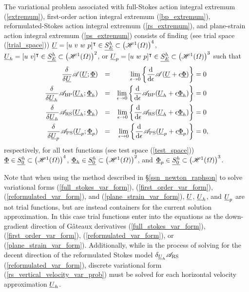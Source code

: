 The variational problem associated with full-Stokes action integral extremum (\ref{extremum}), first-order action integral extremum (\ref{bp_extremum}), reformulated-Stokes action integral extremum (\ref{rs_extremum}), and plane-strain action integral extremum (\ref{ps_extremum}) consists of finding (see trial space (\ref{trial_space})) $\underline{U} = [u\ v\ w\ p]^\intercal \in \underline{S_E^h} \subset \left( \mathscr{H}^1(\varOmega) \right)^4$, $\underline{U}_h = [u\ v]^\intercal \in \underline{S_E^h} \subset \left( \mathscr{H}^1(\varOmega) \right)^2$, or $\underline{U}_p = [u\ w\ p]^\intercal \in \underline{S_E^h} \subset \left( \mathscr{H}^1(\varOmega) \right)^3$ such that
{\small
\begin{align}
  \label{full_stokes_var_form}
  \frac{\delta{^{}} }{\delta \underline{U}{^{}} } \mathscr{A}(\underline{U}; \underline{\Phi}) &&= && \lim_{\epsilon \rightarrow 0} \left\{ \frac{\mathrm{d}^{} }{\mathrm{d} \epsilon^{} } \mathscr{A}(\underline{U} + \epsilon \underline{\Phi}) \right\} &= 0 \\
  \label{first_order_var_form}
  \frac{\delta{^{}} }{\delta \underline{U}_h{^{}} } \mathscr{A}_{\text{BP}}(\underline{U}_h; \underline{\Phi}_h) &&= && \lim_{\epsilon \rightarrow 0} \left\{ \frac{\mathrm{d}^{} }{\mathrm{d} \epsilon^{} } \mathscr{A}_{\text{BP}}(\underline{U}_h + \epsilon \underline{\Phi}_h) \right\} &= 0 \\
  \label{reformulated_var_form}
  \frac{\delta{^{}} }{\delta \underline{U}_h{^{}} } \mathscr{A}_{\text{RS}} (\underline{U}_h; \underline{\Phi}_h) &&= && \lim_{\epsilon \rightarrow 0} \left\{ \frac{\mathrm{d}^{} }{\mathrm{d} \epsilon^{} } \mathscr{A}_{\text{RS}}(\underline{U}_h + \epsilon \underline{\Phi}_h) \right\} &= 0 \\
  \label{plane_strain_var_form}
  \frac{\delta{^{}} }{\delta \underline{U}_p{^{}} } \mathscr{A}_{\text{PS}}(\underline{U}_p; \underline{\Phi}_p) &&= && \lim_{\epsilon \rightarrow 0} \left\{ \frac{\mathrm{d}^{} }{\mathrm{d} \epsilon^{} } \mathscr{A}_{\text{PS}}(\underline{U}_p + \epsilon \underline{\Phi}_p) \right\} &= 0,
\end{align}}
respectively, for all test functions (see test space (\ref{test_space})) $\underline{\Phi} \in \underline{S_0^h} \subset \left( \mathscr{H}^1(\varOmega) \right)^4$, $\underline{\Phi}_h \in \underline{S_0^h} \subset \left( \mathscr{H}^1(\varOmega) \right)^2$, and $\underline{\Phi}_p \in \underline{S_0^h} \subset \left( \mathscr{H}^1(\varOmega) \right)^3$.

Note that when using the method described in \S \ref{ssn_newton_raphson} to solve variational forms (\ref{full_stokes_var_form}), (\ref{first_order_var_form}), (\ref{reformulated_var_form}), and (\ref{plane_strain_var_form}), $\underline{U}$, $\underline{U}_h$, and $\underline{U}_p$ are not trial functions, but are instead containers for the current solution approximation.  In this case trial functions enter into the equations as the down-gradient direction of G\^{a}teaux derivatives (\ref{full_stokes_var_form}), (\ref{first_order_var_form}), (\ref{reformulated_var_form}), or (\ref{plane_strain_var_form}).  Additionally, while in the process of solving for the decent direction of the reformulated Stokes model $\delta_{\underline{U}_h} \mathscr{A}_{\text{RS}}$ (\ref{reformulated_var_form}), discrete variational form (\ref{rs_vertical_velocity_var_prob}) must be solved for each horizontal velocity approximation $\underline{U}_h$.

